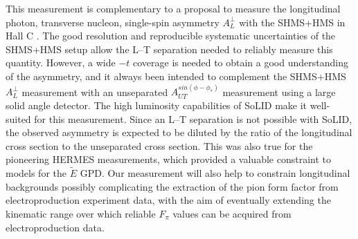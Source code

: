 \documentclass{article}
\begin{document}
This measurement is complementary to a proposal 
to measure the longitudinal photon, transverse nucleon, single-spin
asymmetry $A_L^{\perp}$ with the SHMS+HMS in Hall C \cite{atpi39}.  
The good resolution and reproducible systematic uncertainties of the
SHMS+HMS setup allow the L--T separation needed to reliably measure this
quantity.
However, a wide $-t$ coverage is needed to obtain a good understanding of the
asymmetry, and it always been intended to complement the SHMS+HMS $A_L^{\perp}$
measurement with an unseparated $A_{UT}^{sin(\phi-\phi_s)}$ measurement using
a large solid angle detector.  The high luminosity capabilities of SoLID make
it well-suited for this measurement.  Since an L--T separation is not possible
with SoLID, the observed asymmetry is expected to be diluted by the ratio of
the longitudinal cross section to the unseparated cross section.  This was also
true for the pioneering HERMES measurements, which provided a valuable
constraint to models for the $\tilde{E}$ GPD.
Our measurement will also help to constrain longitudinal backgrounds
possibly complicating the extraction of the pion form factor from
electroproduction experiment data, with the aim of eventually extending the
kinematic range over which reliable $F_{\pi}$ values can be acquired from
electroproduction data.


\newpage
\appendix



\end{document}
